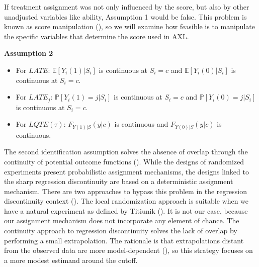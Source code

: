 \documentclass[
  11pt]{article}
\providecommand{\tightlist}{%
  \setlength{\itemsep}{0pt}\setlength{\parskip}{0pt}}
\begin{document}
If treatment assignment was not only influenced by the score, but also
by other unadjusted variables like ability, Assumption 1 would be false.
This problem is known as score manipulation
(), so we
will examine how feasible is to manipulate the specific variables that
determine the score used in AXL.

\begin{tcolorbox}[enhanced jigsaw, breakable, leftrule=.75mm, arc=.35mm, left=2mm, colback=white, rightrule=.15mm, colframe=quarto-callout-tip-color-frame, toprule=.15mm, bottomrule=.15mm, opacityback=0]

\vspace{-3mm}\textbf{Assumption 2}\vspace{3mm}

\begin{itemize}
\tightlist
\item
  For \(LATE\): \(\mathbb{E}[Y_i(1)|S_i]\) is continuous at \(S_i = c\)
  and \(\mathbb{E}[Y_i(0)|S_i]\) is continuous at \(S_i = c\).
\item
  For \(LATE_j\): \(\mathbb{P}[Y_i(1)=j|S_i]\) is continuous at
  \(S_i = c\) and \(\mathbb{P}[Y_i(0)=j|S_i]\) is continuous at
  \(S_i = c\).
\item
  For \(LQTE(\tau)\): \(F_{Y(1)|S}(y|c)\) is continuous and
  \(F_{Y(0)|S}(y|c)\) is continuous.
\end{itemize}

\end{tcolorbox}

The second identification assumption solves the absence of overlap
through the continuity of potential outcome functions
(). While
the designs of randomized experiments present probabilistic assignment
mechanisms, the designs linked to the sharp regression discontinuity are
based on a deterministic assignment mechanism. There are two approaches
to bypass this problem in the regression discontinuity context
(). The local
randomization approach is suitable when we have a natural experiment as
defined by Titiunik (). It is not our
case, because our assignment mechanism does not incorporate any element
of chance. The continuity approach to regression discontinuity solves
the lack of overlap by performing a small extrapolation. The rationale
is that extrapolations distant from the observed data are more
model-dependent (), so
this strategy focuses on a more modest estimand around the cutoff.
\end{document}
